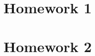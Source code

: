 



\maketitle
\makebox[\linewidth]{\rule{180mm}{1pt}}
\section*{Homework 1}

\section*{Homework 2}

